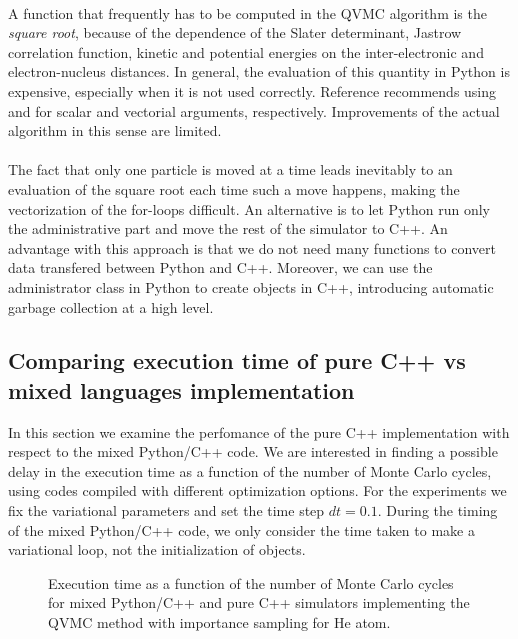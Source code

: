 \\
A function that frequently has to be computed in the QVMC algorithm is the \emph{square root}, because of the dependence of the Slater determinant, Jastrow correlation function, kinetic and potential energies on the inter-electronic and electron-nucleus distances. In general, the evaluation of this quantity in Python is expensive, especially when it is not used correctly. Reference\cite{HPL2008} recommends using  and  for scalar and vectorial arguments, respectively. Improvements of the actual algorithm in this sense are limited.\\
\\
The fact that only one particle is moved at a time leads inevitably to an evaluation of the square root each time such a move happens, making the vectorization of the for-loops difficult. An alternative is to let Python run only the administrative part and move the rest of the simulator to C++. An advantage with this approach is that we do not need many functions to convert data transfered between Python and C++. Moreover, we can use the administrator class in Python to create objects in C++, introducing automatic garbage collection at a high level.


\subsection{Comparing execution time of pure C++ vs mixed languages implementation}

In this section we examine the perfomance of the pure C++ implementation with respect to the mixed Python/C++ code. We are interested in finding a possible delay in the execution time as a function of the number of Monte Carlo cycles, using codes compiled with different optimization options. For the experiments we fix the variational parameters and set the time step $dt = 0.1$.  During the timing of the mixed Python/C++ code, we only consider the time taken to make a variational loop, not the initialization of objects.\\

\begin{figure}
\centering
\scalebox{0.75}{}
\caption{Execution time as a function of the number of Monte Carlo cycles for mixed Python/C++ and pure C++ simulators implementing the QVMC method with importance sampling for He atom.}
\label{execTimeCppVsMixedSmall}
\end{figure}

